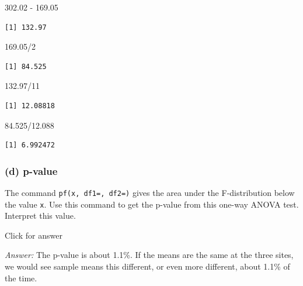 \documentclass[
]{book}
\newenvironment{Shaded}{\begin{snugshade}}{\end{snugshade}}
\newcommand{\DecValTok}[1]{\textcolor[rgb]{0.00,0.00,0.81}{#1}}
\newcommand{\FloatTok}[1]{\textcolor[rgb]{0.00,0.00,0.81}{#1}}
\newcommand{\SpecialCharTok}[1]{\textcolor[rgb]{0.00,0.00,0.00}{#1}}
\begin{document}
\begin{Shaded}
\begin{Highlighting}[]
\FloatTok{302.02} \SpecialCharTok{{-}} \FloatTok{169.05}
\end{Highlighting}
\end{Shaded}

\begin{verbatim}
[1] 132.97
\end{verbatim}

\begin{Shaded}
\begin{Highlighting}[]
\FloatTok{169.05}\SpecialCharTok{/}\DecValTok{2}
\end{Highlighting}
\end{Shaded}

\begin{verbatim}
[1] 84.525
\end{verbatim}

\begin{Shaded}
\begin{Highlighting}[]
\FloatTok{132.97}\SpecialCharTok{/}\DecValTok{11}
\end{Highlighting}
\end{Shaded}

\begin{verbatim}
[1] 12.08818
\end{verbatim}

\begin{Shaded}
\begin{Highlighting}[]
\FloatTok{84.525}\SpecialCharTok{/}\FloatTok{12.088}
\end{Highlighting}
\end{Shaded}

\begin{verbatim}
[1] 6.992472
\end{verbatim}

\hypertarget{d-p-value}{%
\subsubsection{(d) p-value}\label{d-p-value}}

The command \texttt{pf(x,\ df1=,\ df2=)} gives the area under the F-distribution below the value \texttt{x}. Use this command to get the p-value from this one-way ANOVA test. Interpret this value.

Click for answer

\emph{Answer:} The p-value is about 1.1\%. If the means are the same at the three sites, we would see sample means this different, or even more different, about 1.1\% of the time.
\end{document}
